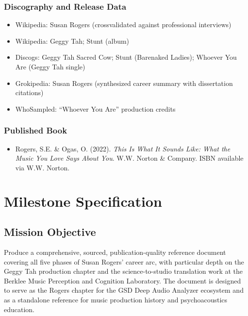 \documentclass[11pt,letterpaper]{article}
\newcommand{\stageheader}[2]{%
  \noindent\colorbox{#2}{\makebox[\textwidth][l]{%
    \textcolor{white}{\bfseries\sffamily\hspace{6pt}#1\hspace{6pt}}}}%
  \vspace{0.5em}\par%
}
\begin{document}
\subsubsection{Discography and Release Data}
\begin{itemize}[leftmargin=2em]
  \item Wikipedia: Susan Rogers (crossvalidated against professional interviews)
  \item Wikipedia: Geggy Tah; Stunt (album)
  \item Discogs: Geggy Tah Sacred Cow; Stunt (Barenaked Ladies); Whoever You Are (Geggy Tah single)
  \item Grokipedia: Susan Rogers (synthesized career summary with dissertation citations)
  \item WhoSampled: ``Whoever You Are'' production credits
\end{itemize}

\subsubsection{Published Book}
\begin{itemize}[leftmargin=2em]
  \item Rogers, S.E. \& Ogas, O. (2022). \textit{This Is What It Sounds Like: What the Music You Love Says About You}. W.W. Norton \& Company. ISBN available via W.W. Norton.
\end{itemize}

\newpage

\stageheader{STAGE 3 --- MISSION PACKAGE}{tertiary}

\section{Milestone Specification}

\subsection{Mission Objective}

Produce a comprehensive, sourced, publication-quality reference document covering all five phases of Susan Rogers' career arc, with particular depth on the Geggy Tah production chapter and the science-to-studio translation work at the Berklee Music Perception and Cognition Laboratory. The document is designed to serve as the Rogers chapter for the GSD Deep Audio Analyzer ecosystem and as a standalone reference for music production history and psychoacoustics education.
\end{document}
